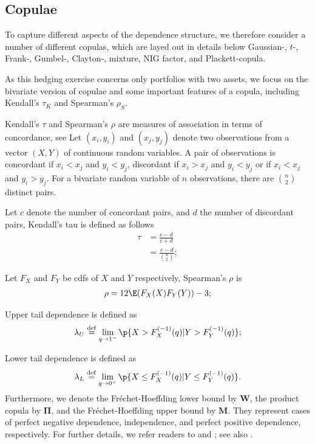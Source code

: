 
\subsection{Copulae}\label{subsec:copulae}
To capture different aspects of the dependence structure, we
  therefore consider a number of different copulas, which are layed
  out in details below \medskip
Gaussian-, $t$-, Frank-,
Gumbel-, Clayton-, mixture, NIG factor, and Plackett-copula. \medskip

As this hedging exercise concerns only portfolios with two assets, we
focus on the bivariate version of copulae and some important
features of a copula, including Kendall's $\tau_K$ and Spearman's $\rho_S$. \medskip

Kendall's $\tau$ and Spearman's $\rho$ are measures of association in terms of concordance, see \cite{kruskal1958ordinal}
Let $(x_i, y_i)$ and $(x_j, y_j)$ denote two observations from a vector $(X, Y)$ of continuous random variables.
A pair of observations is concordant if $x_i<x_j$ and $y_i < y_j$, discordant if
$x_i>x_j$ and $y_i < y_j$ or if $x_i<x_j$ and $y_i>y_j$.
For a bivariate random variable of $n$ observations, there are $\binom{n}{2}$ distinct pairs. \medskip

Let $c$ denote the number of concordant pairs, and $d$ the number of discordant pairs,
Kendall's tau is defined as follows \citep{Nelsen1999}
\begin{align*}
\tau &= \frac{c-d}{c+d} \\[10pt]
     &= \frac{c-d}{\binom{n}{2}};
\end{align*}

Let $F_X$ and $F_Y$ be cdfs of $X$ and $Y$ respectively, Spearman's $\rho$ is
\begin{align*}
\rho = 12\E (F_X(X)F_Y(Y))-3;
\end{align*}

Upper tail dependence is defined as
\begin{equation*}
\lambda_U \overset{\mathrm{def}}{=}  \lim_{q
  \rightarrow 1^-} \p\{X > F_{X}^{(-1)}(q)|Y > F_{Y}^{(-1)}(q)\};
\end{equation*}

Lower tail dependence is defined as
\begin{equation*}
\lambda_L \overset{\mathrm{def}}{=}  \lim_{q
  \rightarrow 0^+} \p\{X \leq F_{X}^{(-1)}(q)|Y \leq
F_{Y}^{(-1)}(q)\}. 
\end{equation*}
Furthermore, we denote the Fr{\'e}chet-Hoeffding lower bound by
$\bm{W}$, the product copula by $\bm{\Pi}$, and the Fr{\'e}chet-Hoeffding
upper bound by $\bm{M}$. They represent cases of perfect negative
dependence, independence, and perfect positive dependence,
respectively. 
For further details, we refer readers to \citet{joe1997multivariate}
and \citet{Nelsen1999}; see also \citet{hardle2010copulis}.

